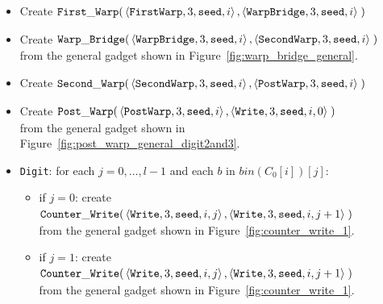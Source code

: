 \begin{itemize}
    \item Create
    $\begin{aligned}[t]
        {\tt First\_Warp}(&\left\langle {\tt FirstWarp},  3, {\tt seed}, i \right\rangle,
                    \left\langle {\tt WarpBridge}, 3, {\tt seed}, i \right\rangle \;)
    \end{aligned}$

    \item Create
    $\begin{aligned}[t]
        {\tt Warp\_Bridge}(&\left\langle {\tt WarpBridge}, 3, {\tt seed}, i \right\rangle,
                     \left\langle {\tt SecondWarp}, 3, {\tt seed}, i \right\rangle \;)
    \end{aligned}$\\ from the general gadget shown in Figure~\ref{fig:warp_bridge_general}.

    \item Create
    $\begin{aligned}[t]
        {\tt Second\_Warp}(&\left\langle {\tt SecondWarp}, 3, {\tt seed}, i  \right\rangle,
                     \left\langle {\tt PostWarp},   3, {\tt seed}, i  \right\rangle \;)
    \end{aligned}$

    \item Create
    $\begin{aligned}[t]
        {\tt Post\_Warp}(&\left\langle {\tt PostWarp}, 3, {\tt seed}, i    \right\rangle,
                   \left\langle {\tt Write},    3, {\tt seed}, i, 0 \right\rangle \;)
    \end{aligned}$\\from the general gadget shown in Figure~\ref{fig:post_warp_general_digit2and3}.



    \item {\tt Digit}: for each $j=0,\ldots,l-1$ and each $b$ in $bin(C_0[i])[j]$:
    \begin{itemize}
        \item if $j = 0$: create
        $\begin{aligned}[t]
            {\tt Counter\_Write}(&\left\langle {\tt Write}, 3, {\tt seed}, i, j \right\rangle, \left\langle {\tt Write}, 3, {\tt seed}, i, j + 1 \right\rangle \;)
        \end{aligned}$\\from the general gadget shown in Figure~\ref{fig:counter_write_1}.

        \item if $j = 1$: create
        $\begin{aligned}[t]
            {\tt Counter\_Write}(&\left\langle {\tt Write}, 3, {\tt seed}, i, j \right\rangle, \left\langle {\tt Write}, 3, {\tt seed}, i, j + 1 \right\rangle \;)
        \end{aligned}$\\from the general gadget shown in Figure~\ref{fig:counter_write_1}.


\end{itemize}
\end{itemize}
